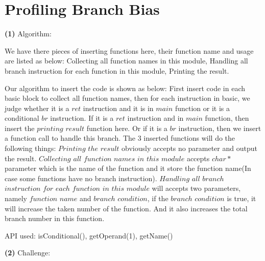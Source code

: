 \documentclass{article}
\renewcommand{\part}[1] {\vspace{.10in} {\bf (#1)}}
\begin{document}
\section{Profiling Branch Bias}


\part{1} Algorithm:

We have there pieces of inserting functions here, their function name and usage are listed as below:
Collecting all function names in this module,
Handling all branch instruction for each function in this module,
Printing the result.

Our algorithm to insert the code is shown as below: First insert code in each basic block to collect all function names, then for each instruction in basic, we judge whether it is a $ret$ instruction and it is in $main$ function or it is a conditional $br$ instruction. If it is a $ret$ instruction and in $main$ function, then insert the $printing$ $result$ function here. Or if it is a $br$ instruction, then we insert a function call to handle this branch. The 3 inserted functions will do the following things: $Printing$ $the$ $result$ obviously accepts no parameter and output the result. $Collecting$ $all$ $function$ $names$ $in$ $this$ $module$ accepts $char *$ parameter which is the name of the function and it store the function name(In case some functions have no branch instruction). $Handling$ $all$ $branch$ $instruction$ $for$ $each$ $function$ $in$ $this$ $module$ will accepts two parameters, namely $function$ $name$ and $branch$ $condition$, if the $branch$ $condition$ is true, it will increase the taken number of the function. And it also increases the total branch number in this function.



API used:
isConditional(),
getOperand(1),
getName()


\part{2} Challenge:
\end{document}
